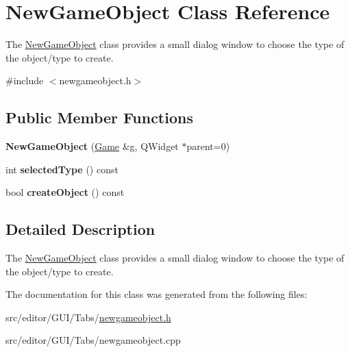 \hypertarget{class_new_game_object}{\section{\-New\-Game\-Object \-Class \-Reference}
\label{class_new_game_object}
}


\-The \hyperlink{class_new_game_object}{\-New\-Game\-Object} class provides a small dialog window to choose the type of the object/type to create.  




{\ttfamily \#include $<$newgameobject.\-h$>$}

\subsection*{\-Public \-Member \-Functions}
\begin{DoxyCompactItemize}
\item 
\hypertarget{class_new_game_object_adc6e1e82d36f115e70424080f7749b09}{{\bfseries \-New\-Game\-Object} (\hyperlink{class_game}{\-Game} \&g, \-Q\-Widget $\ast$parent=0)}\label{class_new_game_object_adc6e1e82d36f115e70424080f7749b09}

\item 
\hypertarget{class_new_game_object_a17f581177d469205b9f29cead231c2e0}{int {\bfseries selected\-Type} () const }\label{class_new_game_object_a17f581177d469205b9f29cead231c2e0}

\item 
\hypertarget{class_new_game_object_ab6fa8cc5d2094702ffccb6d9869a2e03}{bool {\bfseries create\-Object} () const }\label{class_new_game_object_ab6fa8cc5d2094702ffccb6d9869a2e03}

\end{DoxyCompactItemize}


\subsection{\-Detailed \-Description}
\-The \hyperlink{class_new_game_object}{\-New\-Game\-Object} class provides a small dialog window to choose the type of the object/type to create. 

\-The documentation for this class was generated from the following files\-:\begin{DoxyCompactItemize}
\item 
src/editor/\-G\-U\-I/\-Tabs/\hyperlink{newgameobject_8h}{newgameobject.\-h}\item 
src/editor/\-G\-U\-I/\-Tabs/newgameobject.\-cpp\end{DoxyCompactItemize}
